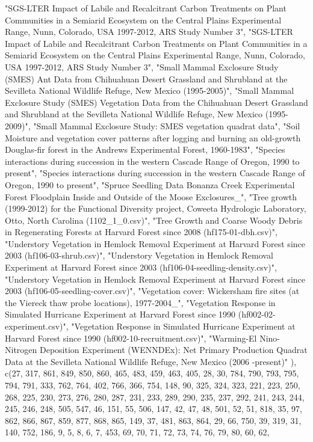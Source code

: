 \documentclass{article}\usepackage[]{graphicx}\usepackage[]{color}
\begin{document}
"SGS-LTER Impact of Labile and Recalcitrant Carbon Treatments on Plant Communities in a Semiarid Ecosystem on the Central Plains Experimental Range, Nunn, Colorado, USA 1997-2012, ARS Study Number 3", "SGS-LTER Impact of Labile and Recalcitrant Carbon Treatments on Plant Communities in a Semiarid Ecosystem on the Central Plains Experimental Range, Nunn, Colorado, USA 1997-2012, ARS Study Number 3", "Small Mammal Exclosure Study (SMES) Ant Data from Chihuahuan Desert Grassland and Shrubland at the Sevilleta National Wildlife Refuge, New Mexico (1995-2005)", 
"Small Mammal Exclosure Study (SMES) Vegetation Data from the Chihuahuan Desert Grassland and Shrubland at the Sevilleta National Wildlife Refuge, New Mexico (1995-2009)", "Small Mammal Exclosure Study: SMES vegetation quadrat data", "Soil Moisture and vegetation cover patterns after logging and burning an old-growth Douglas-fir forest in the Andrews Experimental Forest, 1960-1983", "Species interactions during succession in the western Cascade Range of Oregon, 1990 to present", "Species interactions during succession in the western Cascade Range of Oregon, 1990 to present", 
"Spruce Seedling Data Bonanza Creek Experimental Forest Floodplain Inside and Outside of the Moose Exclosures_", "Tree growth (1999-2012) for the Functional Diversity project, Coweeta Hydrologic Laboratory, Otto, North Carolina (1102_1_0.csv)", "Tree Growth and Coarse Woody Debris in Regenerating Forests at Harvard Forest since 2008 (hf175-01-dbh.csv)", "Understory Vegetation in Hemlock Removal Experiment at Harvard Forest since 2003 (hf106-03-shrub.csv)", "Understory Vegetation in Hemlock Removal Experiment at Harvard Forest since 2003 (hf106-04-seedling-density.csv)", 
"Understory Vegetation in Hemlock Removal Experiment at Harvard Forest since 2003 (hf106-05-seedling-cover.csv)", "Vegetation cover: Wickersham fire sites (at the Viereck thaw probe locations), 1977-2004_", "Vegetation Response in Simulated Hurricane Experiment at Harvard Forest since 1990 (hf002-02-experiment.csv)", "Vegetation Response in Simulated Hurricane Experiment at Harvard Forest since 1990 (hf002-10-recruitment.csv)", "Warming-El Nino-Nitrogen Deposition Experiment (WENNDEx): Net Primary Production Quadrat Data at the Sevilleta National Wildlife Refuge, New Mexico (2006 -present)"
), c(27, 317, 861, 849, 850, 860, 465, 483, 459, 463, 405, 28, 30, 784, 790, 793, 795, 794, 791, 333, 762, 764, 402, 766, 366, 754, 148, 90, 325, 324, 323, 221, 223, 250, 268, 225, 230, 273, 276, 280, 287, 231, 233, 289, 290, 235, 237, 292, 241, 243, 244, 245, 246, 248, 505, 547, 46, 151, 55, 506, 147, 42, 47, 48, 501, 52, 51, 818, 35, 97, 862, 866, 867, 859, 877, 868, 865, 149, 37, 481, 863, 864, 29, 66, 750, 39, 319, 31, 140, 752, 186, 9, 5, 8, 6, 7, 453, 69, 70, 71, 72, 73, 74, 76, 79, 80, 60, 62, 
\end{document}
